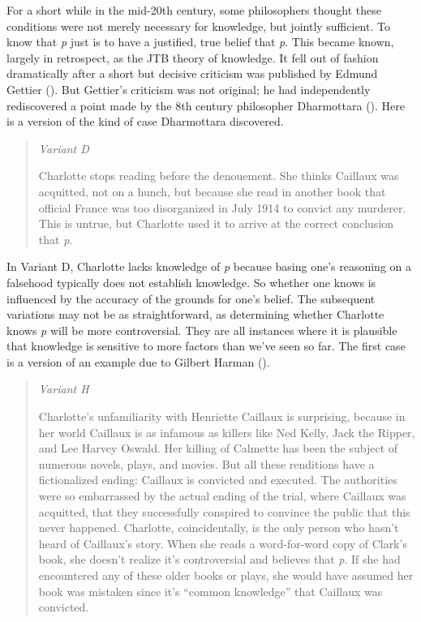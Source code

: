 \documentclass[
  12pt,
  letterpaper,
]{scrbook}
\begin{document}
For a short while in the mid-20th century, some philosophers thought
these conditions were not merely necessary for knowledge, but jointly
sufficient. To know that \emph{p} just is to have a justified, true
belief that \emph{p}. This became known, largely in retrospect, as the
JTB theory of knowledge. It fell out of fashion dramatically after a
short but decisive criticism was published by Edmund Gettier
(). But Gettier's criticism was not
original; he had independently rediscovered a point made by the 8th
century philosopher Dharmottara ().
Here is a version of the kind of case Dharmottara discovered.

\begin{quote}
\emph{Variant D}

Charlotte stops reading before the denouement. She thinks Caillaux was
acquitted, not on a hunch, but because she read in another book that
official France was too disorganized in July 1914 to convict any
murderer. This is untrue, but Charlotte used it to arrive at the correct
conclusion that \emph{p}.
\end{quote}

In Variant D, Charlotte lacks knowledge of \emph{p} because basing one's
reasoning on a falsehood typically does not establish knowledge. So
whether one knows is influenced by the accuracy of the grounds for one's
belief. The subsequent variations may not be as straightforward, as
determining whether Charlotte knows \emph{p} will be more controversial.
They are all instances where it is plausible that knowledge is sensitive
to more factors than we've seen so far. The first case is a version of
an example due to Gilbert Harman ().

\begin{quote}
\emph{Variant H}

Charlotte's unfamiliarity with Henriette Caillaux is surprising, because
in her world Caillaux is as infamous as killers like Ned Kelly, Jack the
Ripper, and Lee Harvey Oswald. Her killing of Calmette has been the
subject of numerous novels, plays, and movies. But all these renditions
have a fictionalized ending: Caillaux is convicted and executed. The
authorities were so embarrassed by the actual ending of the trial, where
Caillaux was acquitted, that they successfully conspired to convince the
public that this never happened. Charlotte, coincidentally, is the only
person who hasn't heard of Caillaux's story. When she reads a
word-for-word copy of Clark's book, she doesn't realize it's
controversial and believes that \emph{p}. If she had encountered any of
these older books or plays, she would have assumed her book was mistaken
since it's ``common knowledge'' that Caillaux was convicted.
\end{quote}
\end{document}
